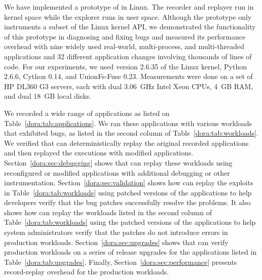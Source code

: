 
We have implemented a prototype of {\dora} in Linux. The recorder and
replayer run in kernel space while the explorer runs in user space.
Although the prototype only instruments a subset of the Linux kernel API, we
demonstrated the functionality of this prototype in diagnosing
and fixing bugs and measured its performance overhead with nine
widely used real-world, multi-process, and multi-threaded applications
and 32 different application changes involving thousands of lines of code.
For our experiments, we used version 2.6.35 of the Linux kernel,
Python 2.6.6, Cython 0.14, and UnionFs-Fuse 0.23.
Measurements were done on a set of HP DL360 G3 servers, each with dual
3.06~GHz Intel Xeon CPUs, 4~GB RAM, and dual 18~GB local disks.

We recorded a wide range of applications as listed on Table~\ref{dora:tab:applications}.
We ran these applications with various workloads that exhibited
bugs, as listed in the second column of Table~\ref{dora:tab:workloads}.
We verified that {\dora} can
deterministically replay the original recorded applications and then
replayed the executions with modified applications.
Section~\ref{dora:sec:debugging} shows that
{\dora} can replay these workloads using reconfigured or
modified applications with additional debugging or other
instrumentation. Section~\ref{dora:sec:validation} shows
how {\dora} can replay the exploits in Table~\ref{dora:tab:workloads}
using patched versions of the applications to help developers
verify that the bug patches successfully resolve the problems.
It also shows how {\dora} can
replay the workloads listed in the second column of
Table~\ref{dora:tab:workloads} using the patched versions of the
applications to help system administrators verify that the patches
do not introduce errors in production workloads.
Section~\ref{dora:sec:upgrades} shows that {\dora} can
verify production workloads on a series of release upgrades for the
applications listed in Table~\ref{dora:tab:upgrades}.
Finally, Section~\ref{dora:sec:performance} presents record-replay
overhead for the production workloads.


